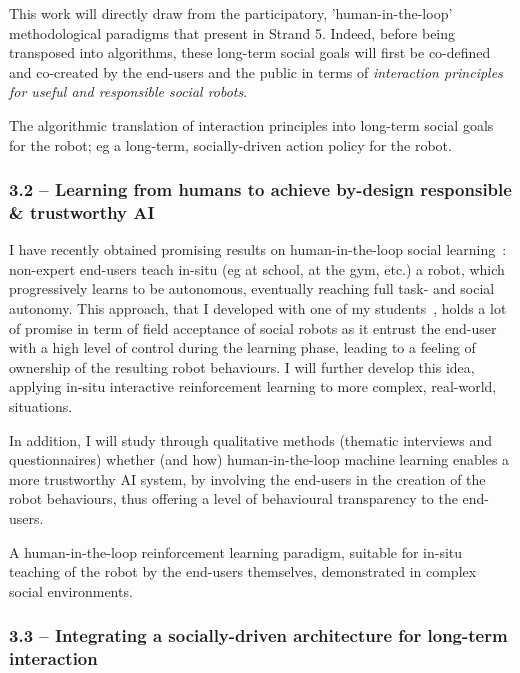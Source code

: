 This work will directly draw from the participatory, 'human-in-the-loop'
methodological paradigms that present in Strand 5. Indeed, before being
transposed into algorithms, these long-term social goals will first be
co-defined and co-created by the end-users and the public in terms of
\emph{interaction principles for useful and responsible social robots}.

\begin{outcome}{3.1}
The algorithmic translation of 
    interaction principles into long-term social goals for the robot; eg a
    long-term, socially-driven action policy for the robot.
\end{outcome}

\subsubsection{3.2 -- Learning from humans to achieve by-design responsible \&
trustworthy AI}

I have recently obtained promising results on human-in-the-loop social
learning~\parencite{senft2019teaching,winkle2020insitu}: non-expert end-users
teach in-situ (eg at school, at the gym, etc.) a robot, which progressively
learns to be autonomous, eventually reaching full task- and social autonomy.
This approach, that I developed with one of my
students~\parencite{senft2017supervised}, holds a lot of promise in term of
field acceptance of social robots as it entrust the end-user with a high level
of control during the learning phase, leading to a feeling of ownership of the
resulting robot behaviours.  I will further develop this idea, applying in-situ
interactive reinforcement learning to more complex, real-world, situations.

In addition, I will study through qualitative methods (thematic interviews and
questionnaires) whether (and how) human-in-the-loop machine learning enables a
more trustworthy AI system, by involving the end-users in the creation of the
robot behaviours, thus offering a level of behavioural transparency to the
end-users.

\begin{outcome}{3.2}
A human-in-the-loop reinforcement
    learning paradigm, suitable for in-situ teaching of the robot by the
    end-users themselves, demonstrated in complex social environments.
\end{outcome}

\subsubsection{3.3 -- Integrating a socially-driven architecture for long-term interaction}

